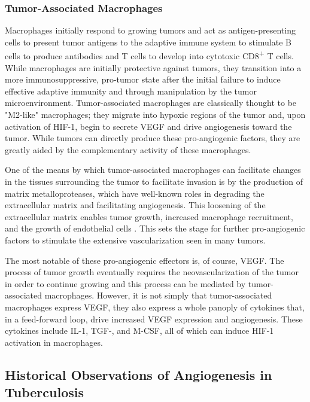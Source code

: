 \subsubsection{Tumor-Associated Macrophages}\label{tams}

Macrophages initially respond to growing tumors and act as antigen-presenting cells to present tumor antigens to the adaptive immune system to stimulate B cells to produce antibodies and T cells to develop into cytotoxic CD8\textsuperscript{+} T cells. While macrophages are initially protective against tumors, they transition into a more immunosuppressive, pro-tumor state after the initial failure to induce effective adaptive immunity and through manipulation by the tumor microenvironment. Tumor-associated macrophages are classically thought to be "M2-like" macrophages; they migrate into hypoxic regions of the tumor and, upon activation of HIF-1\textalpha, begin to secrete VEGF and drive angiogenesis toward the tumor. While tumors can directly produce these pro-angiogenic factors, they are greatly aided by the complementary activity of these macrophages.

One of the means by which tumor-associated macrophages can facilitate changes in the tissues surrounding the tumor to facilitate invasion is by the production of matrix metalloproteases, which have well-known roles in degrading the extracellular matrix and facilitating angiogenesis. This loosening of the extracellular matrix enables tumor growth, increased macrophage recruitment, and the growth of endothelial cells \citep{Lamagna2006}. This sets the stage for further pro-angiogenic factors to stimulate the extensive vascularization seen in many tumors.

The most notable of these pro-angiogenic effectors is, of course, VEGF. The process of tumor growth eventually requires the neovascularization of the tumor in order to continue growing and this process can be mediated by tumor-associated macrophages. However, it is not simply that tumor-associated macrophages express VEGF, they also express a whole panoply of cytokines that, in a feed-forward loop, drive increased VEGF expression and angiogenesis. These cytokines include IL-1\textbeta, TGF-\textbeta, and M-CSF, all of which can induce HIF-1\textalpha{} activation in macrophages.

\subsection{Historical Observations of Angiogenesis in Tuberculosis}\label{histtbang}

